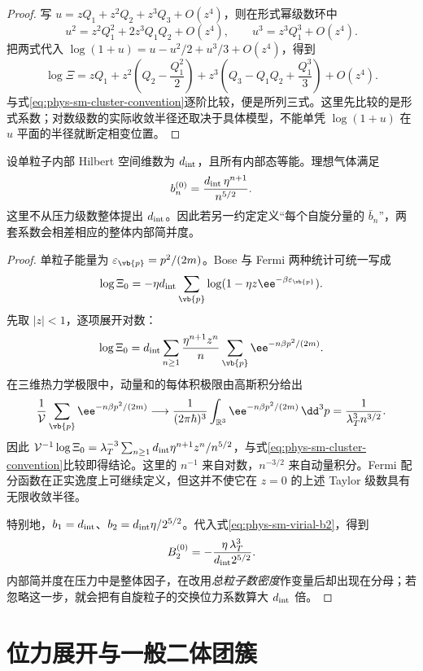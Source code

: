 \begin{proof}
写 \(u=zQ_1+z^2Q_2+z^3Q_3+O(z^4)\)，则在形式幂级数环中
\[
u^2=z^2Q_1^2+2z^3Q_1Q_2+O(z^4),
\qquad
u^3=z^3Q_1^3+O(z^4).
\]
把两式代入 \(\log(1+u)=u-u^2/2+u^3/3+O(z^4)\)，得到
\[
\log\Xi
=zQ_1
+z^2\!\left(Q_2-\frac{Q_1^2}{2}\right)
+z^3\!\left(Q_3-Q_1Q_2+\frac{Q_1^3}{3}\right)
+O(z^4).
\]
与式\cref{eq:phys-sm-cluster-convention}逐阶比较，便是所列三式。这里先比较的是形式系数；对数级数的实际收敛半径还取决于具体模型，不能单凭 \(\log(1+u)\) 在 \(u\) 平面的半径就断定相变位置。
\end{proof}

设单粒子内部 Hilbert 空间维数为 \(d_{\rm int}\)，且所有内部态等能。理想气体满足
\begin{equation}
 b_n^{(0)}
 =\frac{d_{\rm int}\,\eta^{n+1}}{n^{5/2}}.
 \label{eq:phys-sm-ideal-cluster}
\end{equation}
这里不从压力级数整体提出 \(d_{\rm int}\)。因此若另一约定定义“每个自旋分量的 \(\bar b_n\)”，两套系数会相差相应的整体内部简并度。

\begin{proof}
单粒子能量为 \(\varepsilon_{\vb{p}}=p^2/(2m)\)。Bose 与 Fermi 两种统计可统一写成
\[
\log\Xi_0=-\eta d_{\rm int}
\sum_{\vb{p}}\log(1-\eta z\ee^{-\beta\varepsilon_{\vb{p}}}).
\]
先取 \(|z|<1\)，逐项展开对数：
\[
\log\Xi_0
=d_{\rm int}\sum_{n\ge1}\frac{\eta^{n+1}z^n}{n}
\sum_{\vb{p}}\ee^{-n\beta p^2/(2m)}.
\]
在三维热力学极限中，动量和的每体积极限由高斯积分给出
\[
\frac1{\mathcal V}\sum_{\vb{p}}\ee^{-n\beta p^2/(2m)}
\longrightarrow
\frac1{(2\pi\hbar)^3}\int_{\mathbb R^3}
\ee^{-n\beta p^2/(2m)}\,\dd^3p
=\frac1{\lambda_T^3n^{3/2}}.
\]
因此 \(\mathcal V^{-1}\log\Xi_0
=\lambda_T^{-3}\sum_{n\ge1}
d_{\rm int}\eta^{n+1}z^n/n^{5/2}\)，与式\cref{eq:phys-sm-cluster-convention}比较即得结论。这里的 \(n^{-1}\) 来自对数，\(n^{-3/2}\) 来自动量积分。Fermi 配分函数在正实逸度上可继续定义，但这并不使它在 \(z=0\) 的上述 Taylor 级数具有无限收敛半径。

特别地，\(b_1=d_{\rm int}\)、\(b_2=d_{\rm int}\eta/2^{5/2}\)。代入式\cref{eq:phys-sm-virial-b2}，得到
\[
B_2^{(0)}
=-\frac{\eta\,\lambda_T^3}{d_{\rm int}2^{5/2}}.
\]
内部简并度在压力中是整体因子，在改用\emph{总粒子数密度}作变量后却出现在分母；若忽略这一步，就会把有自旋粒子的交换位力系数算大 \(d_{\rm int}\) 倍。
\end{proof}

\section{位力展开与一般二体团簇}

